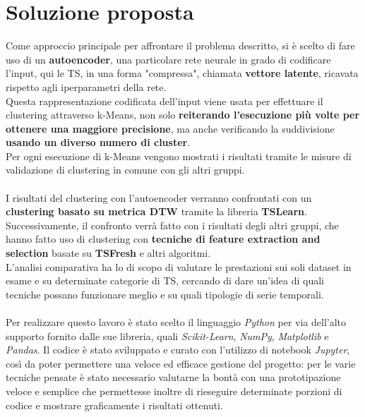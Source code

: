 \section{Soluzione proposta}
Come approccio principale per affrontare il problema descritto, si è scelto di fare uso di un \textbf{autoencoder}, una particolare rete neurale in grado di codificare l'input, qui le TS, in una forma "compressa", chiamata \textbf{vettore latente}, ricavata rispetto agli iperparametri della rete.\\
Questa rappresentazione codificata dell'input viene usata per effettuare il clustering attraverso k-Means, non solo \textbf{reiterando l'esecuzione più volte per ottenere una maggiore precisione}, ma anche verificando la suddivisione \textbf{usando un diverso numero di cluster}.\\
Per ogni esecuzione di k-Means vengono mostrati i risultati tramite le misure di validazione di clustering in comune con gli altri gruppi.\\
\\
I risultati del clustering con l'autoencoder verranno confrontati con un \textbf{clustering basato su metrica DTW} tramite la libreria \textbf{TSLearn}.\\
Successivamente, il confronto verrà fatto con i risultati degli altri gruppi, che hanno fatto uso di clustering con \textbf{tecniche di feature extraction and selection} basate su \textbf{TSFresh} e altri algoritmi.\\
L'analisi comparativa ha lo di scopo di valutare le prestazioni sui soli dataset in esame e su determinate categorie di TS, cercando di dare un'idea di quali tecniche possano funzionare meglio e su quali tipologie di serie temporali.\\
\\
Per realizzare questo lavoro è stato scelto il linguaggio \textit{Python} per via dell'alto supporto fornito dalle sue libreria, quali \textit{Scikit-Learn}\cite{sklearn_api}, \textit{NumPy}\cite{numpy}, \textit{Matplotlib}\cite{matplotlib} e \textit{Pandas}\cite{pandas}. Il codice è stato sviluppato e curato con l'utilizzo di notebook \textit{Jupyter}, così da poter permettere una veloce ed efficace gestione del progetto: per le varie tecniche pensate è stato necessario valutarne la bontà con una prototipazione veloce e semplice che permettesse inoltre di rieseguire determinate porzioni di codice e mostrare graficamente i risultati ottenuti.\\

